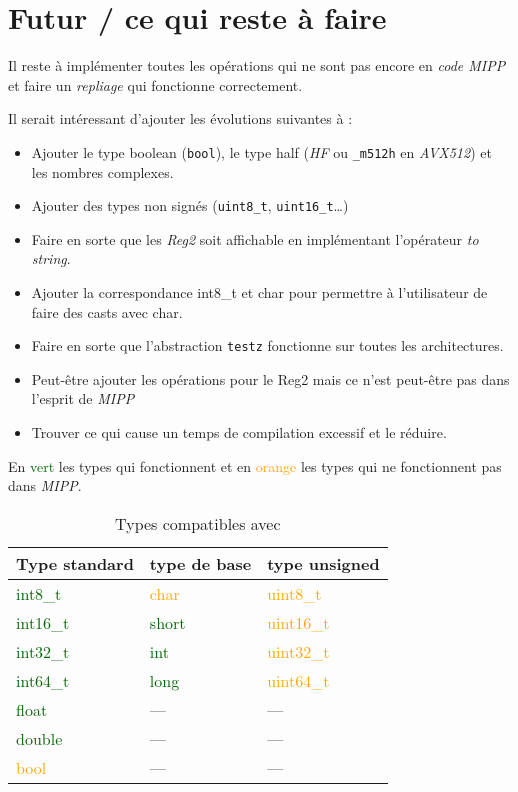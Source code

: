 \section{Futur / ce qui reste à faire}

Il reste à implémenter toutes les opérations qui ne sont pas encore en \emph{code MIPP} et
faire un \textit{repliage} qui fonctionne correctement.

Il serait intéressant d'ajouter les évolutions suivantes à \MIPP :

\begin{itemize}
  \item Ajouter le type boolean (\verb|bool|), le type half (\emph{HF} ou
  \verb|_m512h| en \emph{AVX512}) et les nombres complexes.
  \item Ajouter des types non signés (\verb|uint8_t|, \verb|uint16_t|\dots)
  \item Faire en sorte que les \emph{Reg2} soit affichable en implémentant l'opérateur \emph{to string}.
  \item Ajouter la correspondance int8_t et char pour permettre à l'utilisateur de faire
  des casts avec char.
  \item Faire en sorte que l'abstraction \verb|testz| fonctionne sur toutes les architectures.
  \item Peut-être ajouter les opérations pour le Reg2 mais ce n'est peut-être pas dans
  l'esprit de \emph{MIPP}
  \item Trouver ce qui cause un temps de compilation excessif et le réduire.
\end{itemize}

\begin{table}[H]
  \centering
  \caption*{En \textcolor{darkGreen}{vert} les types qui fonctionnent et en \textcolor{orange}{orange}
    les types qui ne fonctionnent pas dans \emph{MIPP}.}
  \begin{tabular}[H]{|l|l|l|}
    \hline
    \textbf{Type standard}          & \textbf{type de base}        & \textbf{type unsigned}        \\
    \hline
    \textcolor{darkGreen}{int8_t}  & \textcolor{orange}{char}     & \textcolor{orange}{uint8_t}  \\
    \hline
    \textcolor{darkGreen}{int16_t} & \textcolor{darkGreen}{short} & \textcolor{orange}{uint16_t} \\
    \hline
    \textcolor{darkGreen}{int32_t} & \textcolor{darkGreen}{int}   & \textcolor{orange}{uint32_t} \\
    \hline
    \textcolor{darkGreen}{int64_t} & \textcolor{darkGreen}{long}  & \textcolor{orange}{uint64_t} \\
    \hline
    \textcolor{darkGreen}{float}    & \----                        & \----                         \\
    \hline
    \textcolor{darkGreen}{double}   & \----                        & \----                         \\
    \hline
    \textcolor{orange}{bool}        & \----                        & \----                         \\
    \hline
  \end{tabular}
  \caption{Types compatibles avec \MIPP}
\end{table}
